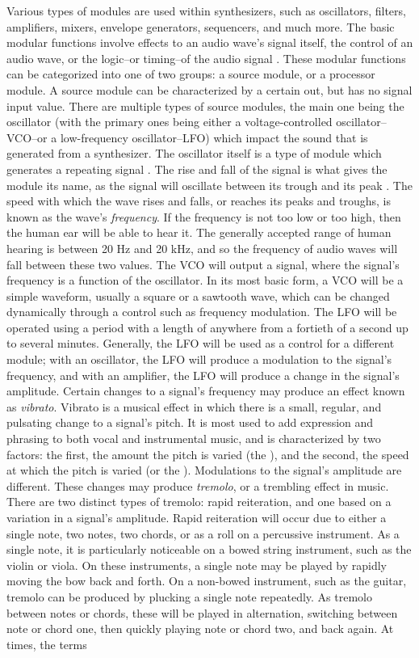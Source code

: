 Various types of modules are used within synthesizers, such as oscillators, filters, amplifiers, mixers, envelope generators, sequencers, and much more. The basic modular functions involve effects to an audio wave's signal itself, the control of an audio wave, or the logic--or timing--of the audio signal \cite{Gabrielli_2020}. These modular functions can be categorized into one of two groups: a source module, or a processor module. A source module can be characterized by a certain out, but has no signal input value. There are multiple types of source modules, the main one being the oscillator (with the primary ones being either a voltage-controlled oscillator--VCO--or a low-frequency oscillator--LFO) which impact the sound that is generated from a synthesizer. The oscillator itself is a type of module which generates a repeating signal \cite{Gabrielli_2020}. The rise and fall of the signal is what gives the module its name, as the signal will oscillate between its trough and its peak \cite{Rosen_Howell_2011}. The speed with which the wave rises and falls, or reaches its peaks and troughs, is known as the wave's \textit{frequency}. If the frequency is not too low or too high, then the human ear will be able to hear it. The generally accepted range of human hearing is between 20 Hz and 20 kHz, and so the frequency of audio waves will fall between these two values. The VCO will output a signal, where the signal's frequency is a function of the oscillator. In its most basic form, a VCO will be a simple waveform, usually a square or a sawtooth wave, which can be changed dynamically through a control such as frequency modulation. The LFO will be operated using a period with a length of anywhere from a fortieth of a second up to several minutes. Generally, the LFO will be used as a control for a different module; with an oscillator, the LFO will produce a modulation to the signal's frequency, and with an amplifier, the LFO will produce a change in the signal's amplitude. Certain changes to a signal's frequency may produce an effect known as \textit{vibrato}. Vibrato is a musical effect in which there is a small, regular, and pulsating change to a signal's pitch. It is most used to add expression and phrasing to both vocal and instrumental music, and is characterized by two factors: the first, the amount the pitch is varied (the ), and the second, the speed at which the pitch is varied (or the ). Modulations to the signal's amplitude are different. These changes may produce \textit{tremolo}, or a trembling effect in music. There are two distinct types of tremolo: rapid reiteration, and one based on a variation in a signal's amplitude. Rapid reiteration will occur due to either a single note, two notes, two chords, or as a roll on a percussive instrument. As a single note, it is particularly noticeable on a bowed string instrument, such as the violin or viola. On these instruments, a single note may be played by rapidly moving the bow back and forth. On a non-bowed instrument, such as the guitar, tremolo can be produced by plucking a single note repeatedly. As tremolo between notes or chords, these will be played in alternation, switching between note or chord one, then quickly playing note or chord two, and back again. At times, the terms 